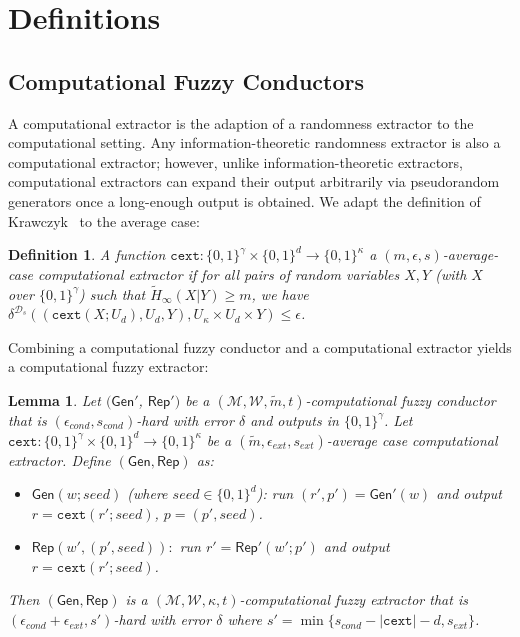 \documentclass[11pt]{article}
\newcommand{\class}[1]{{\ensuremath{\mathsf{#1}}}}
\newcommand{\gen}{\ensuremath{\class{Gen}}\xspace}
\newcommand{\rep}{\ensuremath{\class{Rep}}\xspace}
\newcommand{\zo}{\ensuremath{\{0, 1\}}}
\newcommand{\cext}{\ensuremath{\mathtt{cext}}}
\newtheorem{lemma}[theorem]{Lemma}
\newtheorem{definition}[theorem]{Definition}
\begin{document}
\appendix

\section{Definitions}
\subsection{Computational Fuzzy Conductors}
\label{sec:further defs}
A computational extractor is the adaption of a randomness extractor to the computational setting.  Any information-theoretic randomness extractor is also a computational extractor; however, unlike information-theoretic extractors, computational extractors can expand their output arbitrarily via pseudorandom generators once a long-enough output is obtained. We adapt the definition of Krawczyk~\cite{krawczyk2010cryptographic} to the average case:
\begin{definition}
A function $\cext: \zo^\gamma \times \{0,1\}^d \rightarrow \{0,1\}^\kappa$ a \emph{$(m, \epsilon, s)$-average-case computational extractor} if for all pairs
of random variables $X, Y$ (with $X$ over $\zo^\gamma$) such that
$\tilde{H}_\infty(X|Y) \ge m$, we have $\delta^{\mathcal{D}_{s}}((\cext(X; U_d), U_d, Y), U_\kappa\times
U_d \times Y) \le \epsilon$.
\end{definition}

Combining a computational fuzzy conductor and a computational extractor yields a computational fuzzy extractor:

\begin{lemma}
\label{lem:cond and cext}
Let $(\gen'$, $\rep')$ be a $(\mathcal{M}, \mathcal{W}, \tilde{m}, t)$-computational fuzzy conductor that is $(\epsilon_{cond}, s_{cond})$-hard with error $\delta$ and outputs in $\zo^\gamma$.  Let $\cext:\zo^\gamma\times \zo^d\rightarrow \zo^\kappa$ be a $(\tilde{m}, \epsilon_{ext}, s_{ext})$-average case computational extractor.  Define $(\gen, \rep)$ as:
\begin{itemize}
\item $\gen(w; seed)$ (where $seed\in \zo^d$): run $(r', p')= \gen'(w)$ and output $r = \cext(r'; seed)$, $p = (p', seed)$. 
\item $\rep(w', (p', seed)):$ run $r' = \rep'(w'; p')$ and output $r = \cext(r'; seed)$.
\end{itemize}
Then $(\gen, \rep)$ is a $(\mathcal{M}, \mathcal{W}, \kappa, t)$-computational fuzzy extractor that is $(\epsilon_{cond}+\epsilon_{ext}, s')$-hard with error $\delta$ where $s' = \min\{s_{cond} - |\cext| -d, s_{ext}\}$.
\end{lemma}
\end{document}
